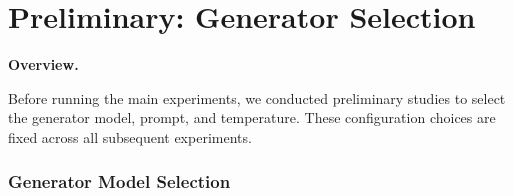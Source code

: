\begingroup
\setlength{\leftskip}{1.25em}
\setlength{\parindent}{0pt}
\setlength{\parskip}{2pt}
\makeatletter
\renewcommand{\paragraph}[1]{\par\noindent\textbf{#1}\par\noindent}
\renewcommand{\subparagraph}[1]{\par\noindent\textbf{#1}\par\noindent}
\makeatother

\section{Preliminary: Generator Selection}
\label{sec:preliminary_studies}

\paragraph{Overview.}
Before running the main experiments, we conducted preliminary studies to select the generator model, prompt, and temperature. These configuration choices are fixed across all subsequent experiments.

\subsubsection{Generator Model Selection}
\label{sec:generator_model_selection}

